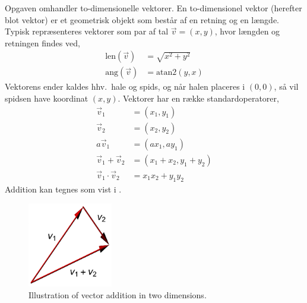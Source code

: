 Opgaven omhandler to-dimensionelle vektorer. En to-dimensionel vektor (herefter blot vektor) er et geometrisk objekt som består af en retning og en længde. Typisk repræsenteres vektorer som par af tal $\vec v  = (x, y)$, hvor længden og retningen findes ved,
\begin{align}
  \text{len}(\vec v) &= \sqrt{x^2+y^2}
  \\\text{ang}(\vec v) &=\text{atan2}(y, x)
\end{align}
Vektorens ender kaldes hhv.\ hale og spids, og når halen placeres i $(0, 0)$, så vil spidsen have koordinat $(x, y)$. Vektorer har en række standardoperatorer,
\begin{align}
  \vec v_1 &= (x_1, y_1)
  \\\vec v_2 &= (x_2, y_2)
  \\a \vec v_1 &= (a x_1, a y_1)
  \\\vec v_1 + \vec v_2 &= (x_1+x_2, y_1+y_2)
  \\\vec v_1 \cdot \vec v_2 &= x_1 x_2 +  y_1y_2
\end{align}
Addition kan tegnes som vist i .
\begin{figure}
  \centering
  \includegraphics[width=0.33\textwidth]{vectorAddition}
  \caption{Illustration of vector addition in two dimensions.}
  \label{fig:vectorAddition}
\end{figure}

